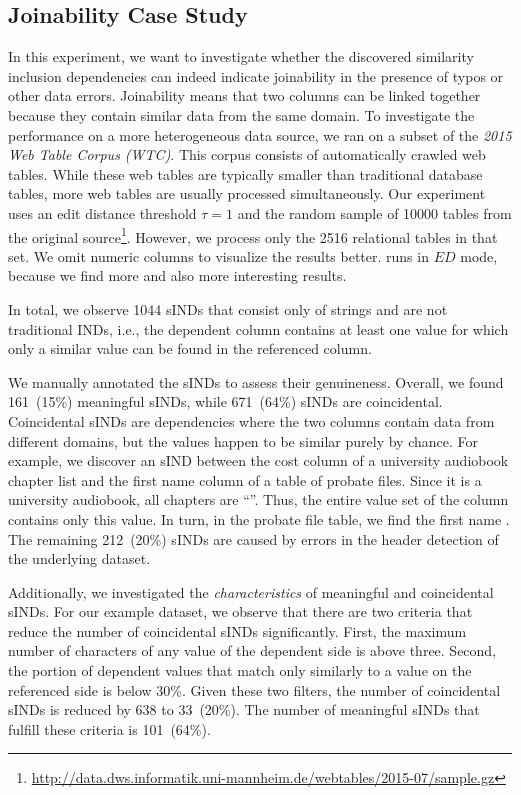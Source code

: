 \subsection{Joinability Case Study}
In this experiment, we want to investigate whether the discovered similarity inclusion dependencies can indeed indicate joinability in the presence of typos or other data errors.
Joinability means that two columns can be linked together because they contain similar data from the same domain\cite{chia2019hyperloglog}.
To investigate the performance on a more heterogeneous data source, we ran \sawfish on a subset of the \emph{2015 Web Table Corpus (WTC)}\cite{lehmberg2016corpus}.
This corpus consists of automatically crawled web tables.
While these web tables are typically smaller than traditional database tables, more web tables are usually processed simultaneously.
Our experiment uses an edit distance threshold $\tau = 1$ and the random sample of \num{10000} tables from the original source\footnote{\url{http://data.dws.informatik.uni-mannheim.de/webtables/2015-07/sample.gz}}.
However, we process only the \num{2516} relational tables in that set.
We omit numeric columns to visualize the results better.
\sawfish runs in $ED$ mode, because we find more and also more interesting results.

In total, we observe \num{1044} sINDs that consist only of strings and are not traditional INDs, i.e., the dependent column contains at least one value for which only a similar value can be found in the referenced column.

We manually annotated the sINDs to assess their genuineness.
Overall, we found 161~(15\%) meaningful sINDs, while 671~(64\%) sINDs are coincidental.
Coincidental sINDs are dependencies where the two columns contain data from different domains, but the values happen to be similar purely by chance. 
For example, we discover an sIND between the cost column of a university audiobook chapter list and the first name column of a table of probate files.
Since it is a university audiobook, all chapters are ``''.
Thus, the entire value set of the column contains only this value.
In turn, in the probate file table, we find the first name .
The remaining 212~(20\%) sINDs are caused by errors in the header detection of the underlying dataset.

Additionally, we investigated the \emph{characteristics} of meaningful and coincidental sINDs.
For our example dataset, we observe that there are two criteria that reduce the number of coincidental sINDs significantly.
First, the maximum number of characters of any value of the dependent side is above three.
Second, the portion of dependent values that match only similarly to a value on the referenced side is below 30\%.
Given these two filters, the number of coincidental sINDs is reduced by 638 to 33~(20\%). 
The number of meaningful sINDs that fulfill these criteria is 101~(64\%).

